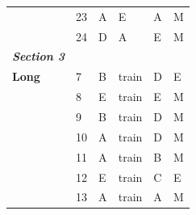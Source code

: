 \documentclass[pageno]{final_paper}
\newcommand{\textbi}[1]{\textbf{\textit{#1}}}
\begin{document}
\begin{table}[]
\begin{tabular}{@{}llllll@{}}
\textbf{}               & 23                                  & A                                          & E                                           & A                                           & M                                       \\
\textbf{}               & 24                                  & D                                          & A                                           & E                                           & M                                       \\ \midrule
\textbi{Section 3}      &                                     &                                            &                                             &                                             &                                         \\ \midrule
\textbf{Long}           & 7                                   & B                                          & train                                       & D                                           & E                                       \\
\textbf{}               & 8                                   & E                                          & train                                       & E                                           & M                                       \\
\textbf{}               & 9                                   & B                                          & train                                       & D                                           & M                                       \\
\textbf{}               & 10                                  & A                                          & train                                       & D                                           & M                                       \\
\textbf{}               & 11                                  & A                                          & train                                       & B                                           & M                                       \\
\textbf{}               & 12                                  & E                                          & train                                       & C                                           & E                                       \\
\textbf{}               & 13                                  & A                                          & train                                       & A                                           & M                                       \\

\end{tabular}
\end{table}
\end{document}
